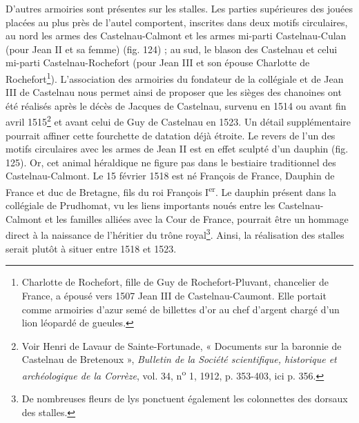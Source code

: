 \documentclass[12pt,twoside,openany]{book}
\begin{document}
D’autres armoiries sont présentes sur les stalles. Les parties supérieures des jouées placées au plus près de l’autel comportent, inscrites dans deux motifs circulaires, au nord les armes des Castelnau-Calmont et les armes mi-parti Castelnau-Culan (pour Jean II et sa femme) (fig. 124) ; au sud, le blason des Castelnau et celui mi-parti Castelnau-Rochefort (pour Jean III et son épouse Charlotte de Rochefort\footnote{Charlotte de Rochefort, fille de Guy de Rochefort-Pluvant, chancelier de France, a épousé vers 1507 Jean III de Castelnau-Caumont. Elle portait comme armoiries d’azur semé de billettes d’or au chef d’argent chargé d’un lion léopardé de gueules.}). L’association des armoiries du fondateur de la collégiale et de Jean III de Castelnau nous permet ainsi de proposer que les sièges des chanoines ont été réalisés après le décès de Jacques de Castelnau, survenu en 1514 ou avant fin avril 1515\footnote{Voir Henri de Lavaur de Sainte-Fortunade, « Documents sur la baronnie de Castelnau de Bretenoux », \textit{Bulletin de la Société scientifique, historique et archéologique de la Corrèze}, vol. 34, n\textsuperscript{o} 1, 1912, p. 353-403, ici p. 356.} et avant celui de Guy de Castelnau en 1523. Un détail supplémentaire pourrait affiner cette fourchette de datation déjà étroite. Le revers de l’un des motifs circulaires avec les armes de Jean II est en effet sculpté d’un dauphin (fig. 125). Or, cet animal héraldique ne figure pas dans le bestiaire traditionnel des Castelnau-Calmont. Le 15 février 1518 est né François de France, Dauphin de France et duc de Bretagne, fils du roi François I\textsuperscript{er}. Le dauphin présent dans la collégiale de Prudhomat, vu les liens importants noués entre les Castelnau-Calmont et les familles alliées avec la Cour de France, pourrait être un hommage direct à la naissance de l’héritier du trône royal\footnote{De nombreuses fleurs de lys ponctuent également les colonnettes des dorsaux des stalles.}. Ainsi, la réalisation des stalles serait plutôt à situer entre 1518 et 1523.
\end{document}
